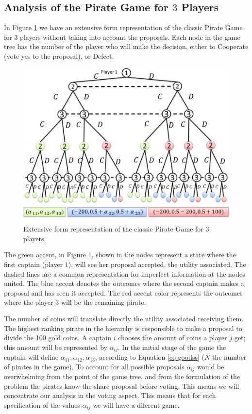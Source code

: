 \documentclass[10pt,twocolumn]{llncs}
\begin{document}
\subsection{Analysis of the Pirate Game for $3$ Players}
\label{subsubsec:analysis_PG3players}

In Figure \ref{fig:pg_architecturegametree:extensiveform} we have an extensive form representation of the classic Pirate Game for $3$ players without taking into account the proposals. Each node in the game tree has the number of the player who will make the decision, either to Cooperate (vote yes to the proposal), or Defect. 

\begin{figure}[h]
\centering 
\includegraphics[scale=0.28]{Figures/1.5qubit/FigurasRevistas/Slide1.png}
\caption{Extensive form representation of the classic Pirate Game for $3$ players. }
\label{fig:pg_architecturegametree:extensiveform}
\end{figure}

The green accent, in Figure \ref{fig:pg_architecturegametree:extensiveform}, shown in the nodes represent a state where the first captain (player $1$), will see her proposal accepted, the utility associated. The dashed lines are a common representation for imperfect information  at the nodes united. The blue accent denotes the outcomes where the second captain makes a proposal and has seen it accepted. The red accent color represents the outcomes where the player $3$ will be the remaining pirate.

The number of coins will translate directly the utility associated receiving them. The highest ranking pirate in the hierarchy is responsible to make a proposal to divide the 100 gold coins. A captain $i$ chooses the amount of coins a player $j$ get; this amount will be represented by $\alpha_{ij}$. In the initial stage of the game the captain will define $\alpha_{11}, \alpha_{12}, \alpha_{13}$, according to Equation \ref{eq:goodss} ($N$ the number of pirates in the game). To account for all possible proposals $\alpha_{ij}$ would be overwhelming from the point of the game tree, and from the formulation of the problem the pirates know the share proposal before voting. This means we will concentrate our analysis in the voting aspect. This means that for each specification of the values $\alpha_{ij}$ we will have a diferent game. 
\end{document}
